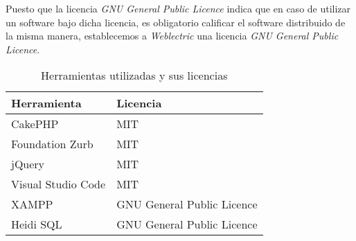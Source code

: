 Puesto que la licencia \textit{GNU General Public Licence} indica que en caso de utilizar un software bajo dicha licencia, es obligatorio calificar el software distribuido de la misma manera, establecemos a \textit{Weblectric} una licencia \textit{GNU General Public Licence}.

\begin{table}[h]
	\centering
	\caption{Herramientas utilizadas y sus licencias}
	\label{tabla:licencias}
	\begin{tabular}{p{4cm} p{6cm}}
		\toprule
		Herramienta & Licencia \\ \midrule
		CakePHP				         & MIT   								\\
		Foundation Zurb		         & MIT   								\\
		jQuery				         & MIT   								\\
		Visual Studio Code 			 & MIT 									\\ 
		XAMPP				         & GNU General Public Licence   		\\ 
		Heidi SQL					 & GNU General Public Licence			\\ \bottomrule
	\end{tabular}
\end{table}


